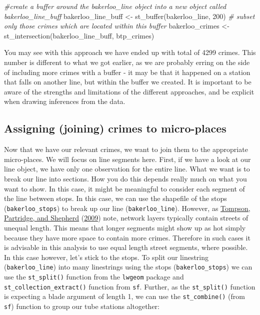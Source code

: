 \documentclass[
  krantz2]{krantz}
\makeatletter
\newenvironment{Shaded}{\begin{snugshade}}{\end{snugshade}}
\newcommand{\CommentTok}[1]{\textcolor[rgb]{0.37,0.37,0.37}{\textit{#1}}}
\newcommand{\DecValTok}[1]{\textcolor[rgb]{0.06,0.06,0.06}{#1}}
\newcommand{\FunctionTok}[1]{\textcolor[rgb]{0,0,0}{#1}}
\newcommand{\NormalTok}[1]{#1}
\newcommand{\OtherTok}[1]{\textcolor[rgb]{0.37,0.37,0.37}{#1}}
\newenvironment{kframe}{%
\medskip{}
\setlength{\fboxsep}{.8em}
 \def\at@end@of@kframe{}%
 \ifinner\ifhmode%
  \def\at@end@of@kframe{\end{minipage}}%
  \begin{minipage}{\columnwidth}%
 \fi\fi%
 \def\FrameCommand##1{\hskip\@totalleftmargin \hskip-\fboxsep
 \colorbox{shadecolor}{##1}\hskip-\fboxsep
     \hskip-\linewidth \hskip-\@totalleftmargin \hskip\columnwidth}%
 \MakeFramed {\advance\hsize-\width
   \@totalleftmargin\z@ \linewidth\hsize
   \@setminipage}}%
 {\par\unskip\endMakeFramed%
 \at@end@of@kframe}
\renewenvironment{Shaded}{\begin{kframe}}{\end{kframe}}
\makeatother
\begin{document}
\begin{Shaded}
\begin{Highlighting}[]
\CommentTok{\#create a buffer around the bakerloo\_line object into a new object called bakerloo\_line\_buff}
\NormalTok{bakerloo\_line\_buff }\OtherTok{\textless{}{-}} \FunctionTok{st\_buffer}\NormalTok{(bakerloo\_line, }\DecValTok{200}\NormalTok{)}
\CommentTok{\# subset only those crimes which are located within this buffer}
\NormalTok{bakerloo\_crimes }\OtherTok{\textless{}{-}} \FunctionTok{st\_intersection}\NormalTok{(bakerloo\_line\_buff, btp\_crimes)}
\end{Highlighting}
\end{Shaded}

You may see with this approach we have ended up with total of 4299 crimes. This number is different to what we got earlier, as we are probably erring on the side of including more crimes with a buffer - it may be that it happened on a station that falls on another line, but within the buffer we created. It is important to be aware of the strengths and limitations of the different approaches, and be explicit when drawing inferences from the data.

\hypertarget{assigning-joining-crimes-to-micro-places}{%
\subsection{Assigning (joining) crimes to micro-places}\label{assigning-joining-crimes-to-micro-places}}

Now that we have our relevant crimes, we want to join them to the appropriate micro-places. We will focus on line segments here. First, if we have a look at our line object, we have only one observation for the entire line. What we want is to break our line into sections. How you do this depends really much on what you want to show. In this case, it might be meaningful to consider each segment of the line between stops. In this case, we can use the shapefile of the stops (\texttt{bakerloo\_stops}) to break up our line (\texttt{bakerloo\_line}). However, as \protect\hyperlink{ref-Tompson_2009}{Tompson, Partridge, and Shepherd} (\protect\hyperlink{ref-Tompson_2009}{2009}) note, network layers typically contain streets of unequal length. This means that longer segments might show up as hot simply because they have more space to contain more crimes. Therefore in such cases it is advisable in this analysis to use equal length street segments, where possible. In this case however, let's stick to the stops. To split our linestring (\texttt{bakerloo\_line}) into many linestrings using the stops (\texttt{bakerloo\_stops}) we can use the \texttt{st\_split()} function from the \texttt{lwgeom} package and \texttt{st\_collection\_extract()} function from \texttt{sf}. Further, as the \texttt{st\_split()} function is expecting a blade argument of length 1, we can use the \texttt{st\_combine()} (from \texttt{sf}) function to group our tube stations altogether:
\end{document}
